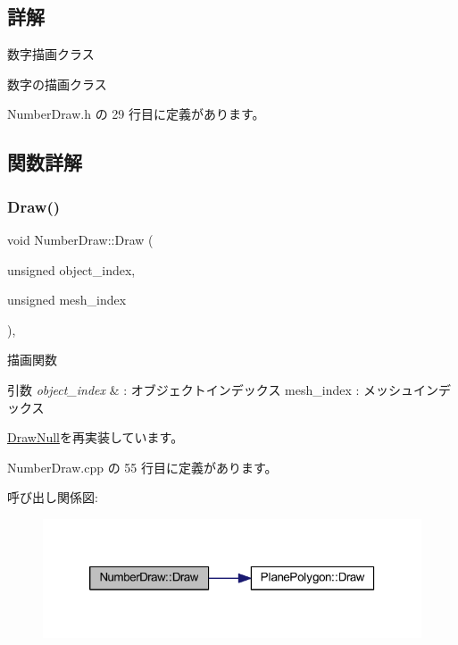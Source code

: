\subsection{詳解}
数字描画クラス 

数字の描画クラス 

 Number\+Draw.\+h の 29 行目に定義があります。



\subsection{関数詳解}
\mbox{\label{class_number_draw_a15e4e602b3f9372349d0b6ff9e4fc423}} 
\subsubsection{\texorpdfstring{Draw()}{Draw()}}
{\footnotesize\ttfamily void Number\+Draw\+::\+Draw (\begin{DoxyParamCaption}\item[{unsigned}]{object\+\_\+index,  }\item[{unsigned}]{mesh\+\_\+index }\end{DoxyParamCaption})\hspace{0.3cm}{\ttfamily [override]}, {\ttfamily [virtual]}}



描画関数 


\begin{DoxyParams}{引数}
{\em object\+\_\+index} & \+: オブジェクトインデックス mesh\+\_\+index \+: メッシュインデックス \\
\hline
\end{DoxyParams}


\mbox{\hyperlink{class_draw_null_afe50f6fd820b18d673f70f048743f339}{Draw\+Null}}を再実装しています。



 Number\+Draw.\+cpp の 55 行目に定義があります。

呼び出し関係図\+:\nopagebreak
\begin{figure}[H]
\begin{center}
\leavevmode
\includegraphics[width=320pt]{class_number_draw_a15e4e602b3f9372349d0b6ff9e4fc423_cgraph}
\end{center}
\end{figure}
\mbox{\label{class_number_draw_ad1d9a4cee49e7bddce51b5c58e739de9}} 
